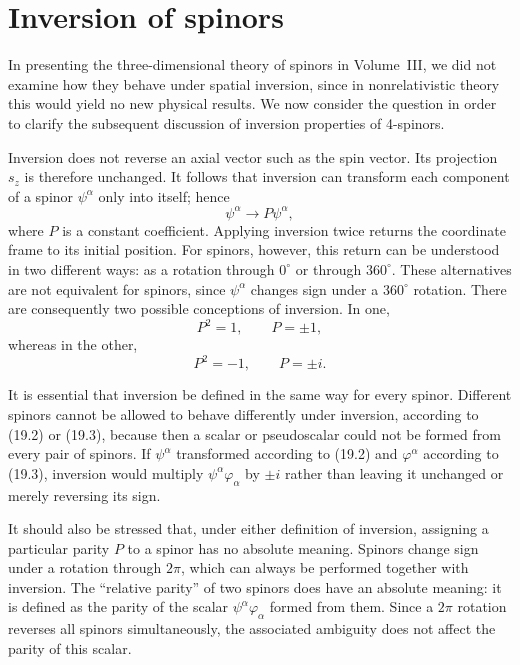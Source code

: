 \section{Inversion of spinors}

In presenting the three-dimensional theory of spinors in Volume~III, we did not examine how they behave under spatial inversion, since in nonrelativistic theory this would yield no new physical results. We now consider the question in order to clarify the subsequent discussion of inversion properties of 4-spinors.

Inversion does not reverse an axial vector such as the spin vector. Its projection $s_z$ is therefore unchanged. It follows that inversion can transform each component of a spinor $\psi^\alpha$ only into itself; hence
\begin{equation}
\psi^\alpha\to P\psi^\alpha,
\tag{19.1}
\end{equation}
where $P$ is a constant coefficient. Applying inversion twice returns the coordinate frame to its initial position. For spinors, however, this return can be understood in two different ways: as a rotation through $0^\circ$ or through $360^\circ$. These alternatives are not equivalent for spinors, since $\psi^\alpha$ changes sign under a $360^\circ$ rotation. There are consequently two possible conceptions of inversion. In one,
\begin{equation}
P^2=1,\qquad P=\pm1,
\tag{19.2}
\end{equation}
whereas in the other,
\begin{equation}
P^2=-1,\qquad P=\pm i.
\tag{19.3}
\end{equation}

It is essential that inversion be defined in the same way for every spinor. Different spinors cannot be allowed to behave differently under inversion, according to (19.2) or (19.3), because then a scalar or pseudoscalar could not be formed from every pair of spinors. If $\psi^\alpha$ transformed according to (19.2) and $\varphi^\alpha$ according to (19.3), inversion would multiply $\psi^\alpha\varphi_\alpha$ by $\pm i$ rather than leaving it unchanged or merely reversing its sign.

It should also be stressed that, under either definition of inversion, assigning a particular parity $P$ to a spinor has no absolute meaning. Spinors change sign under a rotation through $2\pi$, which can always be performed together with inversion. The ``relative parity'' of two spinors does have an absolute meaning: it is defined as the parity of the scalar $\psi^\alpha\varphi_\alpha$ formed from them. Since a $2\pi$ rotation reverses all spinors simultaneously, the associated ambiguity does not affect the parity of this scalar.

